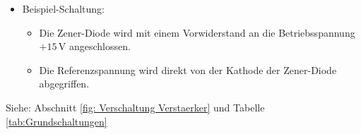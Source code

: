{\begin{itemize}
    \item Beispiel-Schaltung:
    \begin{itemize}
        \item Die Zener-Diode wird mit einem Vorwiderstand an die Betriebsspannung $+15\,\mathrm{V}$ angeschlossen.
        \item Die Referenzspannung wird direkt von der Kathode der Zener-Diode abgegriffen.
    \end{itemize}
\end{itemize}
\begin{figure}[H]
    \centering
    
    \label{fig:LsgAkkuUeberwachung4}
\end{figure}
Siehe: Abschnitt \ref{fig: Verschaltung Verstaerker} und Tabelle \ref{tab:Grundschaltungen}
%    
%    
%    
%    
%    
%    
%    
%    
%    
%    
%    
}
